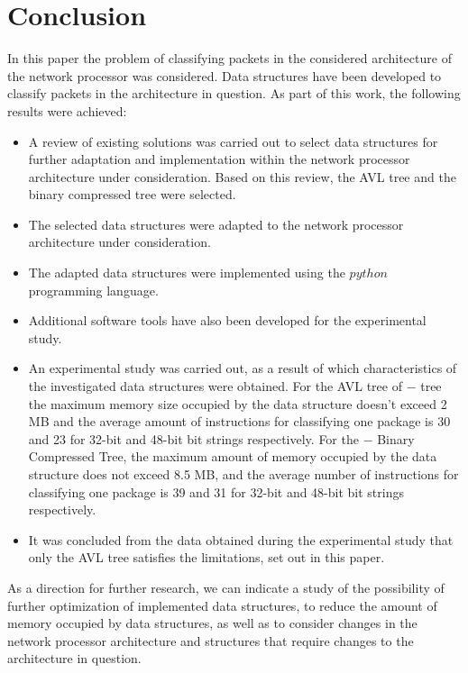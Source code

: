 \documentclass[conference]{IEEEtran}
\begin{document}
    \section{Conclusion}
        In this paper the problem of classifying packets in the considered architecture of the network processor was considered.
        Data structures have been developed to classify packets in the architecture in question.
        As part of this work, the following results were achieved:
        \begin{itemize}
            \item A review of existing solutions was carried out to select data structures 
                for further adaptation and implementation within the network processor architecture under consideration.
                Based on this review, the AVL tree and the binary compressed tree were selected.
            \item The selected data structures were adapted to the network processor architecture under consideration.
            \item The adapted data structures were implemented using the $python$ programming language.
            \item Additional software tools have also been developed for the experimental study.
            \item An experimental study was carried out, as a result of which characteristics 
                of the investigated data structures were obtained.
                For the AVL tree of $-$ tree the maximum memory size occupied 
                by the data structure doesn't exceed 2 MB and the average amount of
                instructions for classifying one package is 30 and 23 for 32-bit and 48-bit bit strings respectively.
                For the $-$ Binary Compressed Tree, the maximum amount of memory occupied 
                by the data structure does not exceed 8.5 MB, and the average number of
                instructions for classifying one package is 39 and 31 for 32-bit and 48-bit bit strings respectively.
            \item It was concluded from the data obtained during the experimental study that only the AVL tree satisfies the limitations,
                set out in this paper.
        \end{itemize}

        As a direction for further research, we can indicate a study of the possibility of further optimization of implemented data structures,
        to reduce the amount of memory occupied by data structures, as well as to consider changes in the network processor architecture
        and structures that require changes to the architecture in question.

\printbibliography{}
\end{document}
